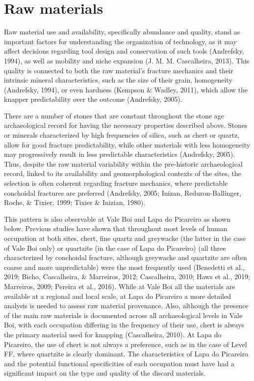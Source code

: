\documentclass[12pt,twoside]{reedthesis}
\begin{document}
\hypertarget{raw-materials}{%
\section{Raw materials}\label{raw-materials}}

Raw material use and availability, specifically abundance and quality, stand as important factors for understanding the organization of technology, as it may affect decisions regarding tool design and conservation of such tools (Andrefsky, 1994), as well as mobility and niche expansion (J. M. M. Cascalheira, 2013). This quality is connected to both the raw material's fracture mechanics and their intrinsic mineral characteristics, such as the size of their grain, homogeneity (Andrefsky, 1994), or even hardness (Kempson \& Wadley, 2011), which allow the knapper predictability over the outcome (Andrefsky, 2005).

There are a number of stones that are constant throughout the stone age archaeological record for having the necessary properties described above. Stones or minerals characterized by high frequencies of silica, such as chert or quartz, allow for good fracture predictability, while other materials with less homogeneity may progressively result in less predictable characteristics (Andrefsky, 2005). Thus, despite the raw material variability within the pre-historic archaeological record, linked to its availability and geomorphological contexts of the sites, the selection is often coherent regarding fracture mechanics, where predictable conchoidal fractures are preferred (Andrefsky, 2005; Inizan, Reduron-Ballinger, Roche, \& Tixier, 1999; Tixier \& Inizian, 1980).

This pattern is also observable at Vale Boi and Lapa do Picareiro as shown below. Previous studies have shown that throughout most levels of human occupation at both sites, chert, fine quartz and greywacke (the latter in the case of Vale Boi only) or quartzite (in the case of Lapa do Picareiro) (all three characterized by conchoidal fracture, although greywacke and quartzite are often coarse and more unpredictable) were the most frequently used (Benedetti et al., 2019; Bicho, Cascalheira, \& Marreiros, 2012; Cascalheira, 2010; Haws et al., 2019; Marreiros, 2009; Pereira et al., 2016). While at Vale Boi all the materials are available at a regional and local scale, at Lapa do Picareiro a more detailed analysis is needed to assess raw material provenance. Also, although the presence of the main raw materials is documented across all archaeological levels in Vale Boi, with each occupation differing in the frequency of their use, chert is always the primary material used for knapping (Cascalheira, 2010). At Lapa do Picareiro, the use of chert is not always a preference, such as in the case of Level FF, where quartzite is clearly dominant. The characteristics of Lapa do Picareiro and the potential functional specificities of each occupation must have had a significant impact on the type and quality of the discard materials.
\end{document}

